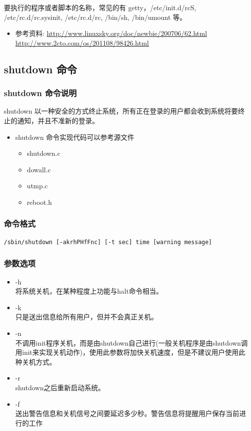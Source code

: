 要执行的程序或者脚本的名称，常见的有 getty，/etc/init.d/rcS,
/etc/rc.d/rc.sysinit, /etc/rc.d/rc, /bin/sh, /bin/umount 等。

\begin{itemize}
\item
  参考资料: \url{http://www.linuxsky.org/doc/newbie/200706/62.html}
  \url{http://www.2cto.com/os/201108/98426.html}
\end{itemize}
\subsection{shutdown 命令}

\subsubsection{shutdown 命令说明}

shutdown
以一种安全的方式终止系统，所有正在登录的用户都会收到系统将要终止的通知，并且不准新的登录。

\begin{itemize}
\item
  shutdown 命令实现代码可以参考源文件
  \begin{itemize}
  \item
    shutdown.c
  \item
    dowall.c
  \item
    utmp.c
  \item
    reboot.h
  \end{itemize}
\end{itemize}
\subsubsection{命令格式}

{\begin{shaded}\begin{verbatim}
/sbin/shutdown [-akrhPHfFnc] [-t sec] time [warning message]
\end{verbatim}\end{shaded}}
\subsubsection{参数选项}

\begin{itemize}
\item
  -h\\ 将系统关机，在某种程度上功能与halt命令相当。
\item
  -k\\ 只是送出信息给所有用户，但并不会真正关机。
\item
  -n\\
  不调用init程序关机，而是由shutdown自己进行(一般关机程序是由shutdown调用init来实现关机动作)，使用此参数将加快关机速度，但是不建议用户使用此种关机方式。
\item
  -r\\ shutdown之后重新启动系统。
\item
  -f \\
  送出警告信息和关机信号之间要延迟多少秒。警告信息将提醒用户保存当前进行的工作
\end{itemize}
